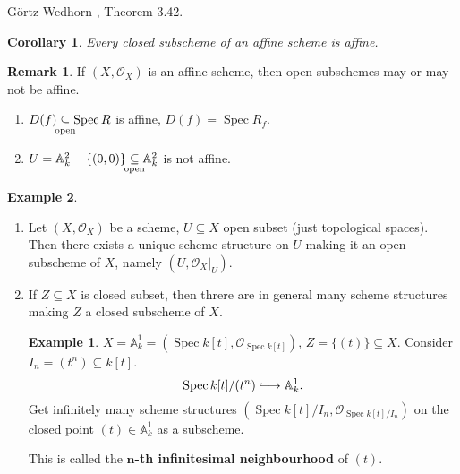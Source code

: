 \documentclass[12pt]{article}
\DeclareMathOperator{\Spec}{Spec}
\newtheorem*{corollary}{Corollary}
\theoremstyle{definition}
\newtheorem*{remark}{Remark}
\newtheorem*{example}{Example}
\begin{document}
G\"{o}rtz-Wedhorn \cite{gortz2010algebraic}, Theorem 3.42.

\begin{corollary}
Every closed subscheme of an affine scheme is affine.
\end{corollary}

\begin{remark}
If $(X,\mathcal{O}_X)$ is an affine scheme, then open subschemes may or may not be affine.

\begin{enumerate}[label=\arabic*)]
\item $D(f)\underset{\mathclap{\text{open}}}{\subseteq}\Spec R$ is affine, $D(f)=\Spec R_f$.

\item $U=\mathbb{A}_k^2-\{(0,0)\}\underset{\mathclap{\text{open}}}{\subseteq}\mathbb{A}_k^2$ is not affine.
\end{enumerate}
\end{remark}

\begin{example}
\begin{enumerate}[label=\arabic*)]
\item Let $(X,\mathcal{O}_X)$ be a scheme, $U\subseteq X$ open subset (just topological spaces). Then there exists a unique scheme structure on $U$ making it an open subscheme of $X$, namely $(U,\mathcal{O}_X|_U)$.

\item If $Z\subseteq X$ is closed subset, then threre are in general many scheme structures making $Z$ a closed subscheme of $X$.
\begin{example}
$X=\mathbb{A}_k^1=(\Spec k[t],\mathcal{O}_{\Spec k[t]})$, $Z=\{(t)\}\subseteq X$. Consider $I_n=(t^n)\subseteq k[t]$.
\[\Spec k[t]/(t^n)\lhook\joinrel\longrightarrow\mathbb{A}_k^1.\]
Get infinitely many scheme structures $(\Spec k[t]/I_n,\mathcal{O}_{\Spec k[t]/I_n})$ on the closed point $(t)\in\mathbb{A}_k^1$ as a subscheme.

This is called the \textbf{$\boldsymbol{n}$-th infinitesimal neighbourhood} of $(t)$.
\end{example}
\end{enumerate}
\end{example}
\end{document}
